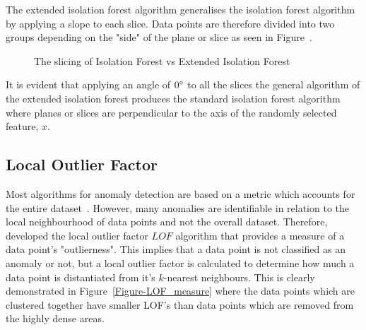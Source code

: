 The extended isolation forest algorithm generalises the isolation forest algorithm by applying a slope to each slice. Data points are therefore divided into two groups depending on the "side" of the plane or slice as seen in Figure~.

\begin{figure}[h!tb]
	\centering
	
	\quad
	\caption[Slicing of Isolation Forest]{The slicing of Isolation Forest vs Extended Isolation Forest}
	\label{Figure-ExtendedvsNormal}
\end{figure}

It is evident that applying an angle of $0\degree$ to all the slices the general algorithm of the extended isolation forest produces the standard isolation forest algorithm where planes or slices are perpendicular to the axis of the randomly selected feature, $x$.

\subsection{Local Outlier Factor}
Most algorithms for anomaly detection are based on a metric which accounts for the entire dataset~\cite{breunig2000lof}. However, many anomalies are identifiable in relation to the local neighbourhood of data points and not the overall dataset. Therefore, \textcite{breunig2000lof} developed the local outlier factor \(LOF\) algorithm that provides a measure of a data point's "outlierness". This implies that a data point is not classified as an anomaly or not, but a local outlier factor is calculated to determine how much a data point is distantiated from it's $k$-nearest neighbours. This is clearly demonstrated in Figure~\ref{Figure-LOF_measure} where the data points which are clustered together have smaller LOF's than data points which are removed from the highly dense areas.

